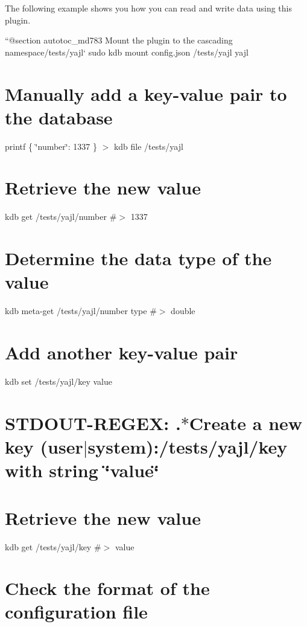 The following example shows you how you can read and write data using this plugin.

``{\ttfamily  @section autotoc\+\_\+md783 Mount the plugin to the cascading namespace}/tests/yajl` sudo kdb mount config.\+json /tests/yajl yajl\hypertarget{autotoc_md777_autotoc_md784}{}\section{Manually add a key-\/value pair to the database}\label{autotoc_md777_autotoc_md784}
printf \textquotesingle{}\{ \char`\"{}number\char`\"{}\+: 1337 \}\textquotesingle{} $>$ {\ttfamily kdb file /tests/yajl}\hypertarget{autotoc_md777_autotoc_md785}{}\section{Retrieve the new value}\label{autotoc_md777_autotoc_md785}
kdb get /tests/yajl/number \#$>$ 1337\hypertarget{autotoc_md777_autotoc_md786}{}\section{Determine the data type of the value}\label{autotoc_md777_autotoc_md786}
kdb meta-\/get /tests/yajl/number type \#$>$ double\hypertarget{autotoc_md777_autotoc_md787}{}\section{Add another key-\/value pair}\label{autotoc_md777_autotoc_md787}
kdb set /tests/yajl/key value \hypertarget{autotoc_md777_autotoc_md788}{}\section{S\+T\+D\+O\+U\+T-\/\+R\+E\+G\+E\+X\+: .$\ast$\+Create a new key (user$\vert$system)\+:/tests/yajl/key with string \char`\"{}value\char`\"{}}\label{autotoc_md777_autotoc_md788}
\hypertarget{autotoc_md777_autotoc_md789}{}\section{Retrieve the new value}\label{autotoc_md777_autotoc_md789}
kdb get /tests/yajl/key \#$>$ value\hypertarget{autotoc_md777_autotoc_md790}{}\section{Check the format of the configuration file}\label{autotoc_md777_autotoc_md790}
